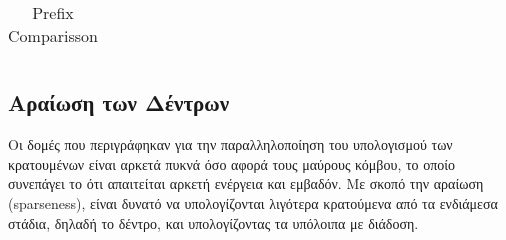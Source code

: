 \begin{table}[H]
\begin{tabular}{  c c c c  }
    \end{tabular}
    
    
    
    
\caption{Prefix Comparisson}
\end{table}

















\subsection{Αραίωση των Δέντρων}
Οι δομές που περιγράφηκαν για την παραλληλοποίηση του υπολογισμού των κρατουμένων 
είναι αρκετά πυκνά όσο αφορά τους μαύρους κόμβου, το οποίο συνεπάγει το ότι 
απαιτείται αρκετή ενέργεια και εμβαδόν. Με σκοπό την αραίωση (sparseness), 
είναι δυνατό να υπολογίζονται λιγότερα κρατούμενα από τα ενδιάμεσα στάδια,
δηλαδή το δέντρο, και υπολογίζοντας τα υπόλοιπα με διάδοση.

